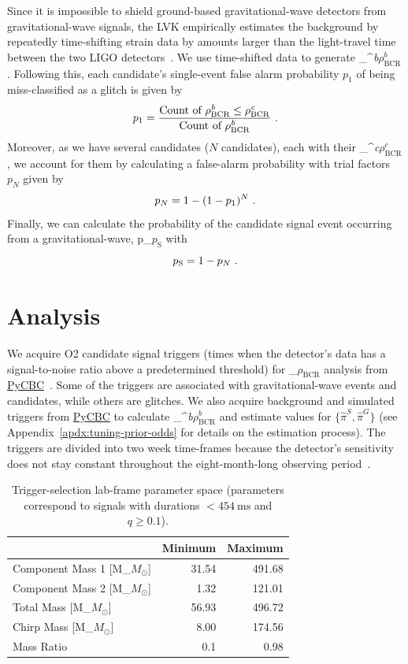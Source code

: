 \documentclass[
 nofootinbib,
 amsmath,amssymb,
 aps,
 twocolumn,
 superscriptaddress
]{revtex4-2}
\newcommand{\pycbc}{{\sc \href{https://pycbc.org/}{{PyCBC}}}\xspace}
\newcommand{\fancytext}[1]{{\relax\ifmmode#1\else $#1$\fi}\xspace}
\newcommand{\mathcmd}[1]{{\sc \relax\ifmmode#1\else $#1$\fi}\xspace}
\newcommand{\bcr}{\mathcmd{\rho_\text{BCR}}}
\newcommand{\bgrdbcr}{\mathcmd{\rho_\text{BCR}^\textit{b}}}
\newcommand{\candbcr}{\mathcmd{\rho_\text{BCR}^\textit{c}}}
\newcommand{\msun}{\mathcmd{M_\odot}}
\newcommand{\fap}{\mathcmd{p_N}}
\newcommand{\pastrobcr}{\fancytext{p_\text{S}}}
\begin{document}
Since it is impossible to shield ground-based gravitational-wave detectors from gravitational-wave signals, the LVK empirically estimates the background by repeatedly time-shifting strain data by amounts larger than the light-travel time between the two LIGO detectors~\cite{GWTC1}. We use time-shifted data to generate \bgrdbcr. Following this, each candidate's single-event false alarm probability $p_1$ of being miss-classified as a glitch is given by
\begin{equation}
    p_1 = \frac{\text{Count of } \bgrdbcr \leq \candbcr}{\text{Count of } \bgrdbcr} \ .
\end{equation}
Moreover, as we have several candidates ($N$ candidates), each with their \candbcr, we account for them by calculating a false-alarm probability with trial factors $p_N$ given by
\begin{equation}
    \fap = 1 - (1-p_1)^N \ .
\end{equation}
Finally, we can calculate the probability of the candidate signal event occurring from  a gravitational-wave, \pastrobcr with 
\begin{equation}
\pastrobcr = 1 - \fap \ . 
\end{equation}


\section{Analysis}\label{sec:Analysis}

We acquire O2 candidate signal triggers (times when the detector's data has a signal-to-noise ratio above a predetermined threshold) for \bcr analysis from \pycbc~\cite{pycbc_code, pycbc_og0, pycbc_og1, pycbc_og2, pycbc_og3, pycbc_og4, pycbc_og5, pycbc_og6}.  Some of the triggers are associated with gravitational-wave events and candidates, while others are glitches. We also acquire background and simulated triggers from \pycbc to calculate \bgrdbcr and estimate values for $\{\hat{\pi}^S,\hat{\pi}^G\}$ (see Appendix~\ref{apdx:tuning-prior-odds} for details on the estimation process). The triggers are divided into two week time-frames because the detector's sensitivity does not stay constant throughout the eight-month-long observing period~\cite{pycbc_og4}.

\begin{table}[t]
\caption[BBH parameters correspond to duration $<454\ \text{ms}$]{\label{tab:parameters}Trigger-selection lab-frame parameter space (parameters correspond to signals with durations $<454 \ \text{ms}$ and $q\geq0.1$).}
\centering
\begin{tabular}{lrr}
\toprule
           & Minimum & Maximum\\
\midrule
Component Mass 1 [\msun] & 31.54 & 491.68\\
Component Mass 2 [\msun] & 1.32 & 121.01\\
Total Mass [\msun] & 56.93 & 496.72\\
Chirp Mass [\msun] & 8.00 & 174.56\\
Mass Ratio & 0.1 & 0.98\\
\end{tabular}
\end{table}
\end{document}
